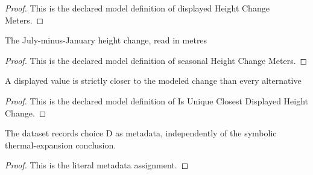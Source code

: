 \begin{proof}
  This is the declared model definition of displayed Height Change Meters.
\end{proof}
\begin{definition}
  \label{def:physics:phyx-mini-0483:phyxminiproblems-problemphyxmini0483-seasonalheightchangemeters}
  The July-minus-January height change, read in metres
\end{definition}
\begin{proof}
  This is the declared model definition of seasonal Height Change Meters.
\end{proof}
\begin{definition}
  \label{def:physics:phyx-mini-0483:phyxminiproblems-problemphyxmini0483-isuniqueclosestdisplayedheightchange}
  A displayed value is strictly closer to the modeled change than every alternative
\end{definition}
\begin{proof}
  This is the declared model definition of Is Unique Closest Displayed Height Change.
\end{proof}
\begin{definition}
  \label{def:physics:phyx-mini-0483:phyxminiproblems-problemphyxmini0483-recordedanswerchoice}
  The dataset records choice D as metadata, independently of the symbolic thermal-expansion conclusion.
\end{definition}
\begin{proof}
  This is the literal metadata assignment.
\end{proof}
